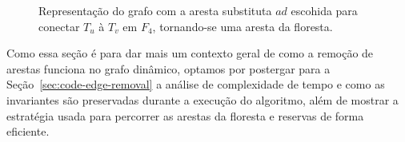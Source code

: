 \begin{figure}[H]
\begin{minipage}[c]{0.8\textwidth}
    \end{minipage}
    \caption{Representação do grafo com a aresta substituta $ad$ escohida para conectar $T_u$ à $T_v$ em $F_4$, tornando-se uma aresta da floresta.}
    \vspace{-1cm}
    \label{fig:example-replacement4}
\end{figure}

Como essa seção é para dar mais um contexto geral de como a remoção de arestas funciona no grafo dinâmico, optamos por postergar para a Seção~\ref{sec:code-edge-removal} a análise de complexidade de tempo e como as invariantes são preservadas durante a execução do algoritmo, além de mostrar a estratégia usada para percorrer as arestas da floresta e reservas de forma eficiente.  








































